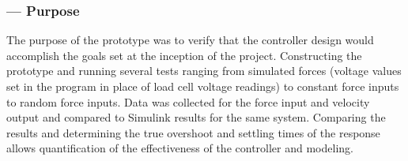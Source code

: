 \subsubsection*{ --- Purpose}
The purpose of the prototype was to verify that the controller design would accomplish the goals set at the inception of the project. Constructing the prototype and running several tests ranging from simulated forces (voltage values set in the program in place of load cell voltage readings) to constant force inputs to random force inputs. Data was collected for the force input and velocity output and compared to Simulink results for the same system. Comparing the results and determining the true overshoot and settling times of the response allows quantification of the effectiveness of the controller and modeling.